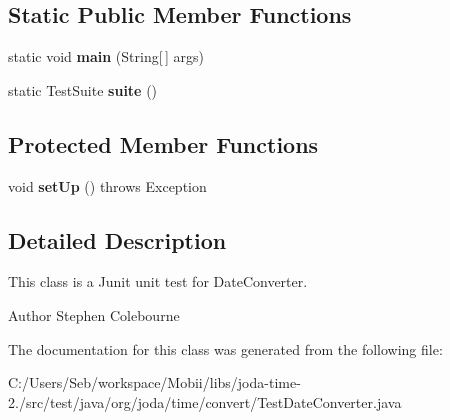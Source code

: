 \subsection*{Static Public Member Functions}
\begin{DoxyCompactItemize}
\item 
\hypertarget{classorg_1_1joda_1_1time_1_1convert_1_1_test_date_converter_a72916864f66c784d0ce6437e9a601ff7}{static void {\bfseries main} (String\mbox{[}$\,$\mbox{]} args)}\label{classorg_1_1joda_1_1time_1_1convert_1_1_test_date_converter_a72916864f66c784d0ce6437e9a601ff7}

\item 
\hypertarget{classorg_1_1joda_1_1time_1_1convert_1_1_test_date_converter_a8365d04ab5c79e91ae9de0f830eca979}{static Test\-Suite {\bfseries suite} ()}\label{classorg_1_1joda_1_1time_1_1convert_1_1_test_date_converter_a8365d04ab5c79e91ae9de0f830eca979}

\end{DoxyCompactItemize}
\subsection*{Protected Member Functions}
\begin{DoxyCompactItemize}
\item 
\hypertarget{classorg_1_1joda_1_1time_1_1convert_1_1_test_date_converter_aca212e497f001bade30426f6065c7311}{void {\bfseries set\-Up} ()  throws Exception }\label{classorg_1_1joda_1_1time_1_1convert_1_1_test_date_converter_aca212e497f001bade30426f6065c7311}

\end{DoxyCompactItemize}


\subsection{Detailed Description}
This class is a Junit unit test for Date\-Converter.

\begin{DoxyAuthor}{Author}
Stephen Colebourne 
\end{DoxyAuthor}


The documentation for this class was generated from the following file\-:\begin{DoxyCompactItemize}
\item 
C\-:/\-Users/\-Seb/workspace/\-Mobii/libs/joda-\/time-\/2./src/test/java/org/joda/time/convert/Test\-Date\-Converter.\-java\end{DoxyCompactItemize}
